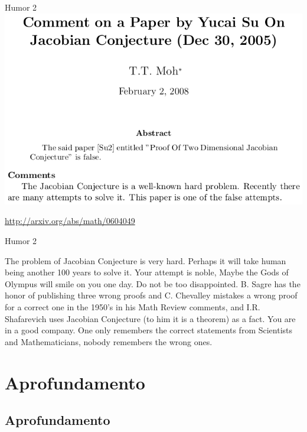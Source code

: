 \documentclass{beamer}
\begin{document}
\begin{frame}{Humor 2}
  \includegraphics[width=\textwidth]{Planejamento/olympus-abs}

  \vfill
  \scriptsize
  \hfill \url{http://arxiv.org/abs/math/0604049}
\end{frame}

\begin{frame}{Humor 2}
  \begin{block}{}
    \footnotesize
    The problem of Jacobian Conjecture is very hard. Perhaps it will
    take human being another 100 years to solve it. \alert{Your
      attempt is noble, Maybe the Gods of Olympus will smile on you
      one day.} Do not be too disappointed. B. Sagre has the honor of
    publishing three wrong proofs and C. Chevalley mistakes a wrong
    proof for a correct one in the 1950’s in his Math Review comments,
    and I.R. Shafarevich uses Jacobian Conjecture (to him it is a
    theorem) as a fact. You are in a good company. One only remembers
    the correct statements from Scientists and Mathematicians, nobody
    remembers the wrong ones.
  \end{block}
\end{frame}

\section{Aprofundamento}

\subsection{Aprofundamento}
\end{document}
